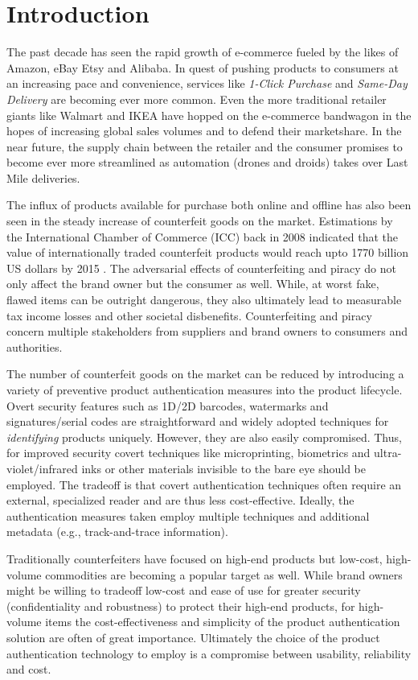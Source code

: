 \documentclass[thesis.tex]{subfiles}
\begin{document}
\chapter{Introduction}
\label{chapter:intro}

The past decade has seen the rapid growth of e-commerce fueled by the likes of Amazon, eBay Etsy and Alibaba. In quest of pushing products to consumers at an increasing pace and convenience, services like \emph{1-Click Purchase} and \emph{Same-Day Delivery} are becoming ever more common. Even the more traditional retailer giants like Walmart and IKEA have hopped on the e-commerce bandwagon in the hopes of increasing global sales volumes and to defend their marketshare. In the near future, the supply chain between the retailer and the consumer promises to become ever more streamlined as automation (drones and droids) takes over Last Mile deliveries.

The influx of products available for purchase both online and offline has also been seen in the steady increase of counterfeit goods on the market. Estimations by the International Chamber of Commerce (ICC) back in 2008 indicated that the value of internationally traded counterfeit products would reach upto 1770 billion US dollars by 2015 \cite{icc}. The adversarial effects of counterfeiting and piracy do not only affect the brand owner but the consumer as well. While, at worst fake, flawed items can be outright dangerous, they also ultimately lead to measurable tax income losses and other societal disbenefits. Counterfeiting and piracy concern multiple stakeholders from suppliers and brand owners to consumers and authorities.

The number of counterfeit goods on the market can be reduced by introducing a variety of preventive product authentication measures into the product lifecycle. Overt security features such as 1D/2D barcodes, watermarks and signatures/serial codes are straightforward and widely adopted techniques for \emph{identifying} products uniquely. However, they are also easily compromised. Thus, for improved security covert techniques like microprinting, biometrics and ultra-violet/infrared inks or other materials invisible to the bare eye should be employed. The tradeoff is that covert authentication techniques often require an external, specialized reader and are thus less cost-effective. Ideally, the authentication measures taken employ multiple techniques and additional metadata (e.g., track-and-trace information).

Traditionally counterfeiters have focused on high-end products but low-cost, high-volume commodities are becoming a popular target as well. While brand owners might be willing to tradeoff low-cost and ease of use for greater security (confidentiality and robustness) to protect their high-end products, for high-volume items the cost-effectiveness and simplicity of the product authentication solution are often of great importance. Ultimately the choice of the product authentication technology to employ is a compromise between usability, reliability and cost.
\end{document}
